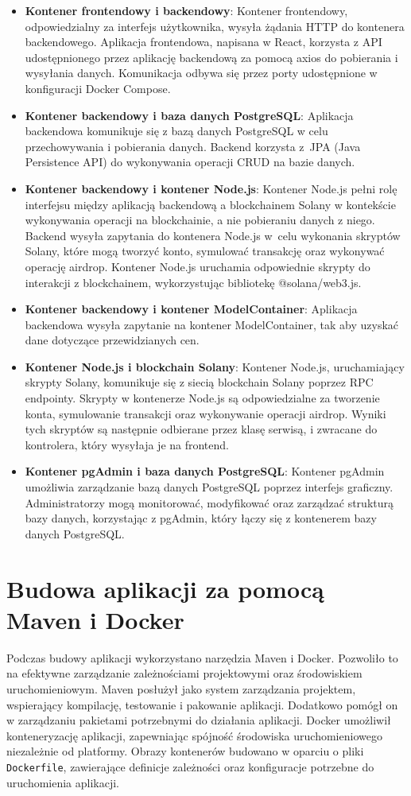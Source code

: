 \begin{itemize}
    \item \textbf{Kontener frontendowy i backendowy}: Kontener frontendowy, odpowiedzialny za interfejs użytkownika, wysyła żądania HTTP do kontenera backendowego. Aplikacja frontendowa, napisana w React, korzysta z API udostępnionego przez aplikację backendową za pomocą axios do pobierania i wysyłania danych. Komunikacja odbywa się przez porty udostępnione w konfiguracji Docker Compose.
    \item \textbf{Kontener backendowy i baza danych PostgreSQL}: Aplikacja backendowa komunikuje się z bazą danych PostgreSQL w celu przechowywania i pobierania danych. Backend korzysta z~JPA (Java Persistence API) do wykonywania operacji CRUD na bazie danych.
    \item \textbf{Kontener backendowy i kontener Node.js}: Kontener Node.js pełni rolę interfejsu między aplikacją backendową a blockchainem Solany w kontekście wykonywania operacji na blockchainie, a nie pobieraniu danych z niego. Backend wysyła zapytania do kontenera Node.js w~celu wykonania skryptów Solany, które mogą tworzyć konto, symulować transakcję oraz wykonywać operację airdrop. Kontener Node.js uruchamia odpowiednie skrypty do interakcji z blockchainem, wykorzystując bibliotekę @solana/web3.js.
		\item \textbf{Kontener backendowy i kontener ModelContainer}: Aplikacja backendowa wysyła zapytanie na kontener ModelContainer, tak aby uzyskać dane dotyczące przewidzianych cen. 
    \item \textbf{Kontener Node.js i blockchain Solany}: Kontener Node.js, uruchamiający skrypty Solany, komunikuje się z siecią blockchain Solany poprzez RPC endpointy. Skrypty w kontenerze Node.js są odpowiedzialne za tworzenie konta, symulowanie transakcji oraz wykonywanie operacji airdrop. Wyniki tych skryptów są następnie odbierane przez klasę serwisą, i zwracane do kontrolera, który wysyłaja je na frontend.
    \item \textbf{Kontener pgAdmin i baza danych PostgreSQL}: Kontener pgAdmin umożliwia zarządzanie bazą danych PostgreSQL poprzez interfejs graficzny. Administratorzy mogą monitorować, modyfikować oraz zarządzać strukturą bazy danych, korzystając z pgAdmin, który łączy się z kontenerem bazy danych PostgreSQL.
\end{itemize}

\section{Budowa aplikacji za pomocą Maven i Docker}
Podczas budowy aplikacji wykorzystano narzędzia Maven i Docker. Pozwoliło to na efektywne zarządzanie  zależnościami projektowymi oraz środowiskiem uruchomieniowym. Maven posłużył jako system zarządzania projektem, wspierający kompilację, testowanie i pakowanie aplikacji. Dodatkowo pomógł on w zarządzaniu pakietami potrzebnymi do działania aplikacji. Docker umożliwił konteneryzację aplikacji, zapewniając spójność środowiska uruchomieniowego niezależnie od platformy. Obrazy kontenerów budowano w oparciu o pliki \texttt{Dockerfile}, zawierające definicje zależności oraz konfiguracje potrzebne do uruchomienia aplikacji. 


